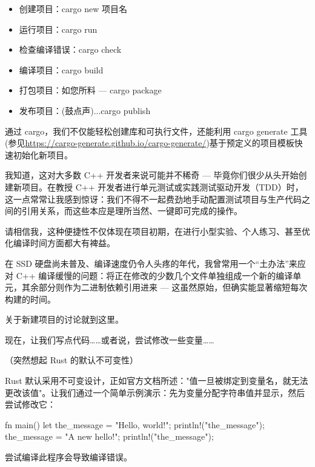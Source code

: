 \begin{itemize}
\item 
创建项目：cargo new 项目名

\item 
运行项目：cargo run

\item 
检查编译错误：cargo check

\item 
编译项目：cargo build

\item 
打包项目：如您所料 --- cargo package

\item 
发布项目：(鼓点声)...cargo publish
\end{itemize}

通过 cargo，我们不仅能轻松创建库和可执行文件，还能利用 cargo generate 工具(参见\url{https://cargo-generate.github.io/cargo-generate/})基于预定义的项目模板快速初始化新项目。

我知道，这对大多数 C++ 开发者来说可能并不稀奇 --- 毕竟你们很少从头开始创建新项目。在教授 C++ 开发者进行单元测试或实践测试驱动开发（TDD）时，这一点常常让我感到惊讶：我们不得不一起费劲地手动配置测试项目与生产代码之间的引用关系，而这些本应是理所当然、一键即可完成的操作。

请相信我，这种便捷性不仅体现在项目初期，在进行小型实验、个人练习、甚至优化编译时间方面都大有裨益。

在 SSD 硬盘尚未普及、编译速度仍令人头疼的年代，我曾常用一个“土办法”来应对 C++ 编译缓慢的问题：将正在修改的少数几个文件单独组成一个新的编译单元，其余部分则作为二进制依赖引用进来 --- 这虽然原始，但确实能显著缩短每次构建的时间。

关于新建项目的讨论就到这里。

现在，让我们写点代码……或者说，尝试修改一些变量……

（突然想起 Rust 的默认不可变性）


Rust 默认采用不可变设计，正如官方文档所述："值一旦被绑定到变量名，就无法更改该值"。让我们通过一个简单示例演示：先为变量分配字符串值并显示，然后尝试修改它：

\begin{rust}
fn main() {
  let the_message = "Hello, world!";
  println!("{the_message}");
  the_message = "A new hello!";
  println!("{the_message}");
}
\end{rust}

尝试编译此程序会导致编译错误。

